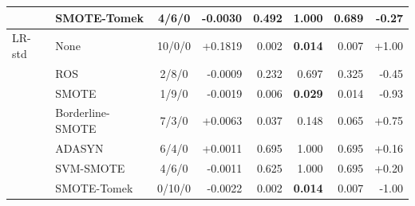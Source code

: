 \documentclass[10pt,a4paper]{article}
\begin{document}
\begin{center}
\begin{longtable}{@{}llcrrrrr@{}}
 & SMOTE-Tomek & 4/6/0 & -0.0030 & 0.492 & 1.000 & 0.689 & -0.27 \\
\midrule
LR-std & None & 10/0/0 & +0.1819 & 0.002 & \textbf{0.014} & 0.007 & +1.00 \\
 & ROS & 2/8/0 & -0.0009 & 0.232 & 0.697 & 0.325 & -0.45 \\
 & SMOTE & 1/9/0 & -0.0019 & 0.006 & \textbf{0.029} & 0.014 & -0.93 \\
 & Borderline-SMOTE & 7/3/0 & +0.0063 & 0.037 & 0.148 & 0.065 & +0.75 \\
 & ADASYN & 6/4/0 & +0.0011 & 0.695 & 1.000 & 0.695 & +0.16 \\
 & SVM-SMOTE & 4/6/0 & -0.0011 & 0.625 & 1.000 & 0.695 & +0.20 \\
 & SMOTE-Tomek & 0/10/0 & -0.0022 & 0.002 & \textbf{0.014} & 0.007 & -1.00 \\
\midrule
\bottomrule\end{longtable}\end{center}
\end{document}
